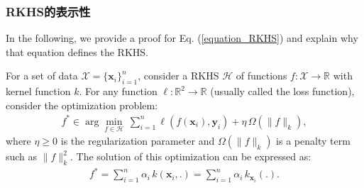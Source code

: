 \documentclass[lang=cn,10pt]{gorgeousnbook}
\numberwithin{equation}{section}%
\numberwithin{figure}{section}%
\begin{document}
\subsubsection{RKHS的表示性}

In the following, we provide a proof for Eq. (\ref{equation_RKHS}) and explain why that equation defines the RKHS. 
\begin{theorem}\label{theorem_representer_theorem}
For a set of data $\mathcal{X} = \{\boldsymbol{x}_i\}_{i=1}^n$, consider a RKHS $\mathcal{H}$ of functions $f: \mathcal{X} \rightarrow \mathbb{R}$ with kernel function $k$.
For any function $\ell: \mathbb{R}^2 \rightarrow \mathbb{R}$ (usually called the loss function), consider the optimization problem:
\begin{align}
f^* \in \arg\min_{f \in \mathcal{H}}\, \sum_{i=1}^n \ell(f(\boldsymbol{x}_i), \boldsymbol{y}_i) + \eta\, \Omega(\|f\|_k),
\end{align}
where $\eta \geq 0$ is the regularization parameter and $\Omega(\|f\|_k)$ is a penalty term such as $\|f\|_k^2$. 
The solution of this optimization can be expressed as:
\begin{align}\label{equation_representer_theorem}
f^* = \sum_{i=1}^n \alpha_i\, k(\boldsymbol{x}_i, .) = \sum_{i=1}^n \alpha_i\, k_{\boldsymbol{x}_i}(.).
\end{align}
\end{theorem}
\end{document}
